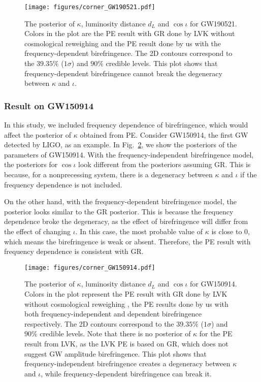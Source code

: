 \documentclass[aps,prd,twocolumn,superscriptaddress,preprintnumbers,floatfix,nofootinbib]{revtex4-2}
\begin{document}
\begin{figure}[h]
    \texttt{[image: figures/corner\_GW190521.pdf]}
    \caption{
        The posterior of $\kappa$, luminosity distance $d_L$ and $\cos{\iota}$ for GW190521.
        Colors in the plot are the \ac{PE} result with GR done by LVK without cosmological reweighing \citep{GWTC-2.1, GWTC-3, GWTC-2.1_dataset, GWTC-3_dataset} and the \ac{PE} result done by us with the frequency-dependent birefringence.
        The 2D contours correspond to the $39.35\%$ ($1\sigma$) and $90\%$ credible levels.
        This plot shows that frequency-dependent birefringence cannot break the degeneracy between $\kappa$ and $\iota$.
    }
    \label{fig:corner_GW190521}
\end{figure}

\subsubsection{Result on GW150914}
In this study, we included frequency dependence of birefringence, which would affect the posterior of $\kappa$ obtained from \ac{PE}.
Consider GW150914, the first GW detected by LIGO, as an example.
In Fig.~\ref{fig:corner_GW150914}, we show the posteriors of the parameters of GW150914.
With the frequency-independent birefringence model, the posteriors for $\cos\iota$ look different from the posteriors assuming GR.
This is because, for a nonprecessing system, there is a degeneracy between $\kappa$ and $\iota$ if the frequency dependence is not included.

On the other hand, with the frequency-dependent birefringence model, the posterior looks similar to the GR posterior.
This is because the frequency dependence broke the degeneracy, as the effect of birefringence will differ from the effect of changing $\iota$.
In this case, the most probable value of $\kappa$ is close to $0$, which means the birefringence is weak or absent.
Therefore, the \ac{PE} result with frequency dependence is consistent with GR.

\begin{figure}
    \texttt{[image: figures/corner\_GW150914.pdf]}
    \caption{
        The posterior of $\kappa$, luminosity distance $d_L$ and $\cos{\iota}$ for GW150914.
        Colors in the plot represent the \ac{PE} result with GR done by LVK without cosmological reweighing \citep{GWTC-2.1, GWTC-3, GWTC-2.1_dataset, GWTC-3_dataset}, the \ac{PE} results done by us with both frequency-independent and dependent birefringence respectively.
        The 2D contours correspond to the $39.35\%$ ($1\sigma$) and $90\%$ credible levels.
        Note that there is no posterior of $\kappa$ for the \ac{PE} result from LVK, as the LVK \ac{PE} is based on GR, which does not suggest GW amplitude birefringence.
        This plot shows that frequency-independent birefringence creates a degeneracy between $\kappa$ and $\iota$, while frequency-dependent birefringence can break it.
    }
    \label{fig:corner_GW150914}
\end{figure}
\end{document}
